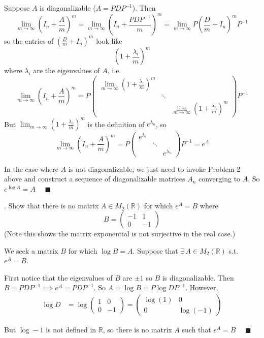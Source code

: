 \documentclass[12pt]{article}
\newcommand{\R}{\mathbb{R}}
\renewcommand{\R}{\mathbb{R}}
\newcommand{\qed}{\quad \blacksquare}
\begin{document}
    \color{blue}
        Suppose $A$ is diagonalizable ($A = PDP^{-1}$). Then
        \[\lim_{m\to\infty} (I_n + \frac{A}{m})^m = \lim_{m\to \infty} (I_n + \frac{PDP^{-1}}{m})^m = \lim_{m\to\infty} P(\frac{D}{m} + I_n)^m P^{-1}\]
        so the entries of $(\frac{D}{m} + I_n)^m$ look like 
        \[(1 + \frac{\lambda_i}{m})^m\]
        where $\lambda_i$ are the eigenvalues of $A$, i.e. 
        \[\lim_{m\to\infty} (I_n + \frac{A}{m})^m = P\begin{pmatrix}
            \lim_{m\to\infty} (1 + \frac{\lambda_1}{m})^m\\
            & \ddots\\
            & & \lim_{m\to\infty} (1 + \frac{\lambda_n}{m})^m
        \end{pmatrix}P^{-1}\] 
        But $\lim_{m\to\infty}(1 + \frac{\lambda_n}{m})^m$ is the definition of $e^{\lambda_n}$, so
        \[\lim_{m\to\infty} (I_n + \frac{A}{m})^m = P\begin{pmatrix}
            e^{\lambda_1}\\
            & \ddots\\
            & & e^{\lambda_n}
        \end{pmatrix}P^{-1} = e^A\]

        In the case where $A$ is not diagonalizable, we just need to invoke Problem 2 above and construct a sequence of diagonalizable matrices $A_n$ converging to $A$. So $e^{\log A} = A$ $\qed$

    \color{black}

.  Show that there is no matrix $A \in M_{2}(\R)$ for which $e^{A} = B$ where 
\[B = \left(
    \begin{array}{cc}
    -1 & 1 \\
    0 & -1
    \end{array}
\right)\]
(Note this shows the matrix exponential is not surjective in the real case.)

    \color{blue}
        We seek a matrix $B$ for which $\log B = A$. Suppose that $\exists\, A \in M_2(\R)$ s.t. $e^A = B$. 
        
        First notice that the eigenvalues of $B$ are $\pm 1$ so $B$ is diagonalizable. Then $B = PDP^{-1} \implies e^A = PDP^{-1}$. So $A = \log B = P\log D P^{-1}$. However, 
        \begin{align*}
            \log D &= \log \begin{pmatrix}
                1 & 0\\ 
                0 & -1
            \end{pmatrix} = \begin{pmatrix}
                    \log (1) & 0\\ 
                    0 & \log (-1)
                \end{pmatrix} 
        \end{align*}

        But $\log -1$ is not defined in $\R$, so there is no matrix $A$ such that $e^A = B$ $\qed$
    \color{black}
\end{document}
